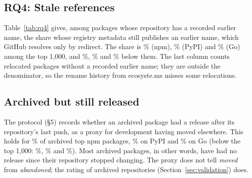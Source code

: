 \documentclass[11pt,a4paper]{article}
\begin{document}
\begin{table}[t]
\centering\small
\caption{RQ3. Share (\%) of archived and unreachable packages with a
registry deprecation flag, an OSV record matching the pre-registered
terms, or an endoflife.date product, with Wilson 95\% intervals.}
\label{tab:rq3}
\resizebox{\linewidth}{!}{\tableRQthree}
\end{table}

\subsection{RQ4: Stale references}

Table~\ref{tab:rq4} gives, among packages whose repository has a recorded
earlier name, the share whose registry metadata still publishes an
earlier name, which GitHub resolves only by redirect. The share is
\% (npm), \% (PyPI) and
\% (Go) among the top 1,000, and
\%, \% and \%
below them. The last column counts relocated packages without a recorded
earlier name; they are outside the denominator, so the rename history
from ecosyste.ms misses some relocations.

\begin{table}[t]
\centering\small
\caption{RQ4. Among packages with a recorded earlier repository name, the
share (\%) whose published repository name is stale, with Wilson 95\%
intervals; and relocated packages with no recorded earlier name.}
\label{tab:rq4}
\resizebox{\linewidth}{!}{\tableRQfour}
\end{table}

\subsection{Archived but still released}

The protocol (§5) records whether an archived package had a release after
its repository's last push, as a proxy for development having moved
elsewhere. This holds for \% of archived
top npm packages, \% on PyPI and
\% on Go (below the top 1,000:
\%, \%
and \%). Most archived packages, in other
words, have had no release since their repository stopped changing. The
proxy does not tell \emph{moved} from \emph{abandoned}; the rating of
archived repositories (Section~\ref{sec:validation}) does.
\end{document}
